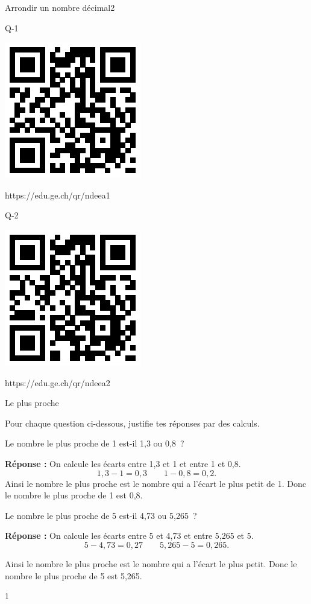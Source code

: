 \documentclass[a4paper,11pt]{report}
\begin{document}
\newpage 

\begin{qmoodle}{Arrondir un nombre décimal}{2}{
	\begin{center}	
		Q-1

\includegraphics[scale=1]{media/qr/ndeea1}

\tiny{{https://edu.ge.ch/qr/ndeea1}}
\end{center}
	\begin{center}	
		Q-2

\includegraphics[scale=1]{media/qr/ndeea2}

\tiny{{https://edu.ge.ch/qr/ndeea2}}
\end{center}
}
\end{qmoodle}

\begin{resolu}
{Le plus proche}{Pour chaque question ci-dessous, justifie tes réponses par des calculs.
\begin{tasks}[after-item-skip = 0.2em, after-skip=-0.5em]
\task Le nombre le plus proche de 1 est-il 1,3 ou 0,8~?

{\bf Réponse :} On calcule les écarts entre 1,3 et 1 et entre 1 et 0,8. $$1,3-1=0,3\qquad 1-0,8 = 0,2.$$
Ainsi le nombre le plus proche est le nombre qui a l'écart le plus petit de 1. Donc le nombre le plus proche de 1 est 0,8.
 
\task Le nombre le plus proche de 5 est-il 4,73 ou 5,265~?

{\bf Réponse :} On calcule les écarts entre 5 et 4,73 et entre 5,265 et 5. $$5-4,73=0,27 \qquad 5,265-5=0,265.$$

Ainsi le nombre le plus proche est le nombre qui a l'écart le plus petit. Donc le nombre le plus proche de 5 est 5,265.
\end{tasks}
}{1}
\end{resolu}
\end{document}

